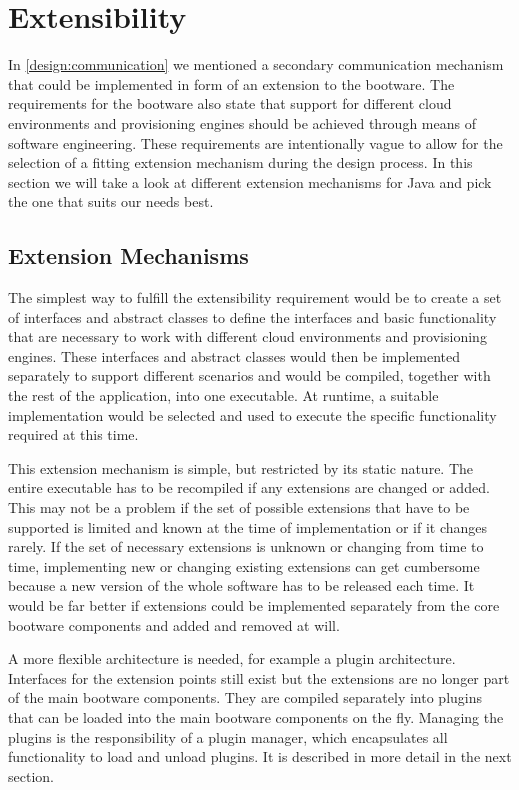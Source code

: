 \section{Extensibility}
\label{design:extensibility}

In \autoref{design:communication} we mentioned a secondary communication mechanism that could be implemented in form of an extension to the bootware.
The requirements for the bootware also state that support for different cloud environments and provisioning engines should be achieved through means of software engineering.
These requirements are intentionally vague to allow for the selection of a fitting extension mechanism during the design process.
In this section we will take a look at different extension mechanisms for Java and pick the one that suits our needs best.

\subsection{Extension Mechanisms}

The simplest way to fulfill the extensibility requirement would be to create a set of interfaces and abstract classes to define the interfaces and basic functionality that are necessary to work with different cloud environments and provisioning engines.
These interfaces and abstract classes would then be implemented separately to support different scenarios and would be compiled, together with the rest of the application, into one executable.
At runtime, a suitable implementation would be selected and used to execute the specific functionality required at this time.

This extension mechanism is simple, but restricted by its static nature.
The entire executable has to be recompiled if any extensions are changed or added.
This may not be a problem if the set of possible extensions that have to be supported is limited and known at the time of implementation or if it changes rarely.
If the set of necessary extensions is unknown or changing from time to time, implementing new or changing existing extensions can get cumbersome because a new version of the whole software has to be released each time.
It would be far better if extensions could be implemented separately from the core bootware components and added and removed at will.

A more flexible architecture is needed, for example a plugin architecture.
Interfaces for the extension points still exist but the extensions are no longer part of the main bootware components.
They are compiled separately into plugins that can be loaded into the main bootware components on the fly.
Managing the plugins is the responsibility of a plugin manager, which encapsulates all functionality to load and unload plugins.
It is described in more detail in the next section.

